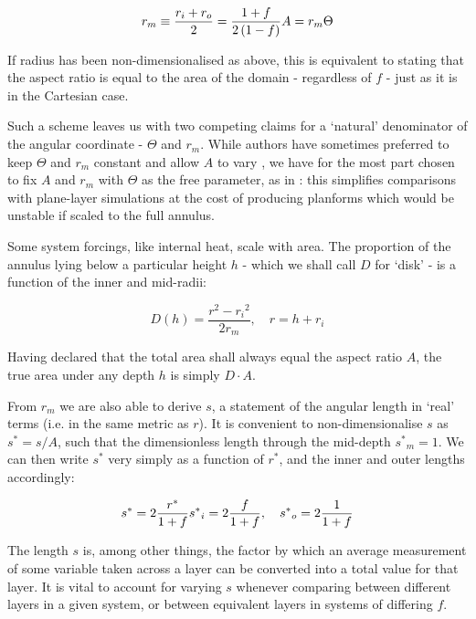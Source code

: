 \documentclass[a4paper,11pt,oneside]{book}
\begin{document}
\begin{equation}
r_m \equiv \frac{r_{i} + r_{o}}{2} = \frac{1 + f}{2 \left( 1 - f \right)} \\
A = r_m \Theta
\end{equation}

If radius has been non-dimensionalised as above, this is equivalent to stating that the aspect ratio is equal to the area of the domain - regardless of $f$ - just as it is in the Cartesian case.

Such a scheme leaves us with two competing claims for a `natural' denominator of the angular coordinate - $\Theta$ and $r_m$. While authors have sometimes preferred to keep $\Theta$ and $r_m$ constant and allow $A$ to vary \cite{Jarvis1994-np}, we have for the most part chosen to fix $A$ and $r_m$ with $\Theta$ as the free parameter, as in \cite{Jarvis1993-cb}: this simplifies comparisons with plane-layer simulations at the cost of producing planforms which would be unstable if scaled to the full annulus.

Some system forcings, like internal heat, scale with area. The proportion of the annulus lying below a particular height $h$ - which we shall call $D$ for `disk' - is a function of the inner and mid-radii:

\begin{equation}
D(h) = \frac{r^2 - {r_i}^2}{2 r_m}, \quad r = h + r_i
\end{equation}

Having declared that the total area shall always equal the aspect ratio $A$, the true area under any depth $h$ is simply $D \cdot A$.

From $r_m$ we are also able to derive $s$, a statement of the angular length in `real' terms (i.e. in the same metric as $r$). It is convenient to non-dimensionalise $s$ as $s^{*} = s / A$, such that the dimensionless length through the mid-depth ${s^{*}}_m = 1$. We can then write $s^{*}$ very simply as a function of $r^{*}$, and the inner and outer lengths accordingly:

\begin{equation}
s^{*} = 2 \frac{r^{*}}{1+f} \\
{s^{*}}_i = 2 \frac{f}{1+f}, \quad {s^{*}}_o = 2 \frac{1}{1+f}
\end{equation}

The length $s$ is, among other things, the factor by which an average measurement of some variable taken across a layer can be converted into a total value for that layer. It is vital to account for varying $s$ whenever comparing between different layers in a given system, or between equivalent layers in systems of differing $f$.
\end{document}
